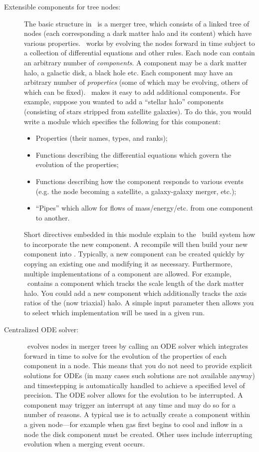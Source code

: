 \begin{description}
 \item [Extensible components for tree nodes:] The basic structure in \glc\ is a merger tree, which consists of a linked tree of nodes (each corresponding a dark matter halo and its content) which have various properties. \glc\ works by evolving the nodes forward in time subject to a collection of differential equations and other rules. Each node can contain an arbitrary number of \emph{components}. A component may be a dark matter halo, a galactic disk, a black hole etc. Each component may have an arbitrary number of \emph{properties} (some of which may be evolving, others of which can be fixed). \glc\ makes it easy to add additional components. For example, suppose you wanted to add a ``stellar halo'' components (consisting of stars stripped from satellite galaxies). To do this, you would write a module which specifies the following for this component:
 \begin{itemize}
  \item Properties (their names, types, and ranks);
  \item Functions describing the differential equations which govern the evolution of the properties;
  \item Functions describing how the component responds to various events (e.g. the node becoming a satellite, a galaxy-galaxy merger, etc.);
  \item ``Pipes'' which allow for flows of mass/energy/etc. from one component to another.
 \end{itemize}
 Short directives embedded in this module explain to the \glc\ build system how to incorporate the new component. A recompile will then build your new component into \glc. Typically, a new component can be created quickly by copying an existing one and modifying it as necessary. Furthermore, multiple implementations of a component are allowed. For example, \glc\ contains a component which tracks the scale length of the dark matter halo. You could add a new component which additionally tracks the axis ratios of the (now triaxial) halo. A simple input parameter then allows you to select which implementation will be used in a given run.

 \item [Centralized ODE solver:] \glc\ evolves nodes in merger trees by calling an ODE solver which integrates forward in time to solve for the evolution of the properties of each component in a node. This means that you do not need to provide explicit solutions for ODEs (in many cases such solutions are not available anyway) and timestepping is automatically handled to achieve a specified level of precision. The ODE solver allows for the evolution to be interrupted. A component may trigger an interrupt at any time and may do so for a number of reasons. A typical use is to actually create a component within a given node---for example when gas first begins to cool and inflow in a node the disk component must be created. Other uses include interrupting evolution when a merging event occurs.
\end{description}

